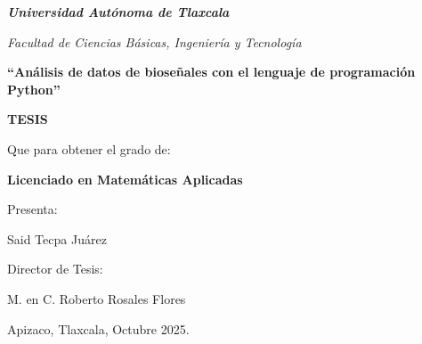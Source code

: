 \documentclass[12pt,letterpaper]{report}
\theoremstyle{plain}
\begin{document}
 \pagestyle{empty}
 \BgThispage%
 \LARGE

 \hspace{2.8cm}
\begin{minipage}[l]{15cm}
\begin{center}
\textbf{\textit{\textcolor[rgb]{0.30,0.04,0.04}{Universidad Autónoma de Tlaxcala}}}
\end{center}

 \Large
\begin{center}
\emph{\textcolor[rgb]{0.43,0.00,0.00}{Facultad de Ciencias  Básicas, Ingeniería y Tecnología}}
\end{center}
\vspace{2cm}
\begin{center}
\textbf{ ``Análisis de datos de bioseñales con el lenguaje de programación Python'' }
\end{center}
\vspace{1.2cm}

\begin{center}
\textbf{TESIS}

 \vspace{1.2cm}

Que para obtener el grado de:

 \textbf{Licenciado en Matemáticas Aplicadas}

\vspace{1.2cm}

 Presenta:

Said Tecpa Juárez
\end{center}
\vspace{.5cm}

\begin{center}
Director de Tesis:

M. en C. Roberto Rosales Flores
\end{center}

\end{minipage}

\vfill{
\begin{flushright}
\normalsize
Apizaco, Tlaxcala, Octubre  2025.
\end{flushright}
}


\normalsize
%




\pagestyle{plain}

\tableofcontents
\listoffigures
\listoftables

\pagestyle{fancy}
\fancyhead[RE]{ }%
\fancyhead[LO]{ }%









\appendix



\end{document}
